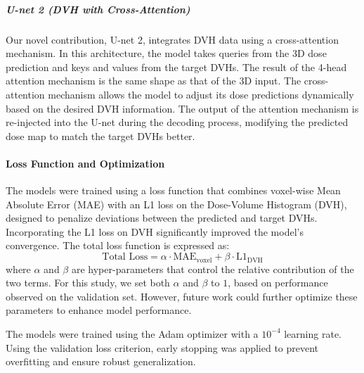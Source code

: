 \subparagraph{U-net 2 (DVH with Cross-Attention)}
Our novel contribution, U-net 2, integrates DVH data using a cross-attention mechanism.
In this architecture, the model takes queries from the 3D dose prediction and keys and values from the target DVHs.
The result of the 4-head attention mechanism is the same shape as that of the 3D input.
The cross-attention mechanism allows the model to adjust its dose predictions dynamically based on the desired DVH information.
The output of the attention mechanism is re-injected into the U-net during the decoding process, modifying the predicted dose map to match the target DVHs better.

\paragraph{Loss Function and Optimization}
The models were trained using a loss function that combines voxel-wise Mean Absolute Error (MAE) with an L1 loss on the Dose-Volume Histogram (DVH), designed to penalize deviations between the predicted and target DVHs.
Incorporating the L1 loss on DVH significantly improved the model’s convergence.
The total loss function is expressed as:
$$
\text{Total Loss} = \alpha \cdot \text{MAE}_{\text{voxel}} + \beta \cdot \text{L1}_{\text{DVH}}
$$
where $\alpha$ and $\beta$ are hyper-parameters that control the relative contribution of the two terms.
For this study, we set both $\alpha$ and $\beta$ to $1$, based on performance observed on the validation set.
However, future work could further optimize these parameters to enhance model performance.

The models were trained using the Adam optimizer with a $10^{-4}$ learning rate.
Using the validation loss criterion, early stopping was applied to prevent overfitting and ensure robust generalization.



